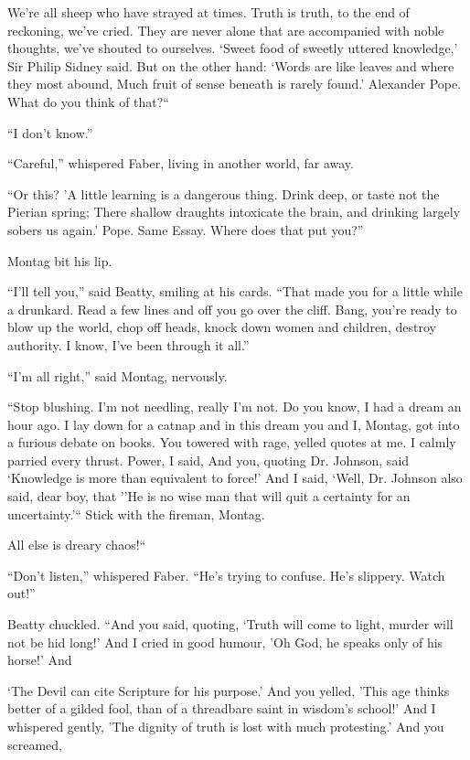 \documentclass[11pt,openany]{book}
\begin{document}
We're all sheep who have strayed at times. Truth is truth, to the end of reckoning, we've cried. They are never alone that are accompanied with noble thoughts, we've shouted to ourselves. `Sweet food of sweetly uttered knowledge,' Sir Philip Sidney said. But on the other hand: `Words are like leaves and where they most abound, Much fruit of sense beneath is rarely found.' Alexander Pope. What do you think of that?``

``I don't know.''

``Careful,'' whispered Faber, living in another world, far away.

``Or this? 'A little learning is a dangerous thing. Drink deep, or taste not the Pierian spring; There shallow draughts intoxicate the brain, and drinking largely sobers us again.' Pope. Same Essay. Where does that put you?''

Montag bit his lip.

``I'll tell you,'' said Beatty, smiling at his cards. ``That made you for a little while a drunkard. Read a few lines and off you go over the cliff. Bang, you're ready to blow up the world, chop off heads, knock down women and children, destroy authority. I know, I've been through it all.''

``I'm all right,'' said Montag, nervously.

``Stop blushing. I'm not needling, really I'm not. Do you know, I had a dream an hour ago. I lay down for a catnap and in this dream you and I, Montag, got into a furious debate on books. You towered with rage, yelled quotes at me. I calmly parried every thrust. Power, I said, And you, quoting Dr. Johnson, said `Knowledge is more than equivalent to force!' And I said, `Well, Dr. Johnson also said, dear boy, that ''He is no wise man that will quit a certainty for an uncertainty.'`` Stick with the fireman, Montag.

All else is dreary chaos!``

``Don't listen,'' whispered Faber. ``He's trying to confuse. He's slippery. Watch out!''

Beatty chuckled. ``And you said, quoting, `Truth will come to light, murder will not be hid long!' And I cried in good humour, 'Oh God, he speaks only of his horse!' And

`The Devil can cite Scripture for his purpose.' And you yelled, 'This age thinks better of a gilded fool, than of a threadbare saint in wisdom's school!' And I whispered gently, 'The dignity of truth is lost with much protesting.' And you screamed,
\end{document}
